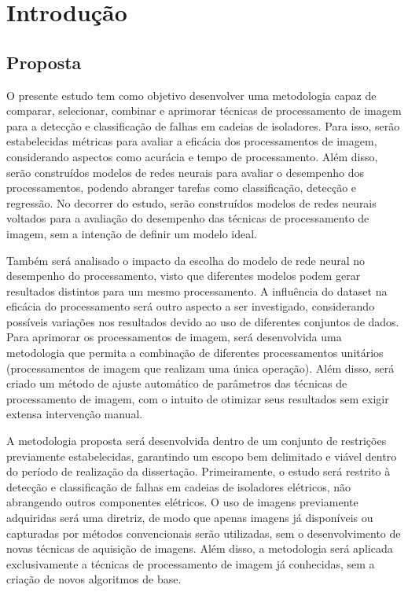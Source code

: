 \chapter{Introdução}

\section{Proposta}

O presente estudo tem como objetivo desenvolver uma metodologia capaz de comparar, selecionar, combinar e aprimorar técnicas de processamento de imagem para a detecção e classificação de falhas em cadeias de isoladores. Para isso, serão estabelecidas métricas para avaliar a eficácia dos processamentos de imagem, considerando aspectos como acurácia e tempo de processamento. Além disso, serão construídos modelos de redes neurais para avaliar o desempenho dos processamentos, podendo abranger tarefas como classificação, detecção e regressão. No decorrer do estudo, serão construídos modelos de redes neurais voltados para a avaliação do desempenho das técnicas de processamento de imagem, sem a intenção de definir um modelo ideal.

Também será analisado o impacto da escolha do modelo de rede neural no desempenho do processamento, visto que diferentes modelos podem gerar resultados distintos para um mesmo processamento. A influência do dataset na eficácia do processamento será outro aspecto a ser investigado, considerando possíveis variações nos resultados devido ao uso de diferentes conjuntos de dados. Para aprimorar os processamentos de imagem, será desenvolvida uma metodologia que permita a combinação de diferentes processamentos unitários (processamentos de imagem que realizam uma única operação). Além disso, será criado um método de ajuste automático de parâmetros das técnicas de processamento de imagem, com o intuito de otimizar seus resultados sem exigir extensa intervenção manual.

A metodologia proposta será desenvolvida dentro de um conjunto de restrições previamente estabelecidas, garantindo um escopo bem delimitado e viável dentro do período de realização da dissertação. Primeiramente, o estudo será restrito à detecção e classificação de falhas em cadeias de isoladores elétricos, não abrangendo outros componentes elétricos. O uso de imagens previamente adquiridas será uma diretriz, de modo que apenas imagens já disponíveis ou capturadas por métodos convencionais serão utilizadas, sem o desenvolvimento de novas técnicas de aquisição de imagens. Além disso, a metodologia será aplicada exclusivamente a técnicas de processamento de imagem já conhecidas, sem a criação de novos algoritmos de base.

